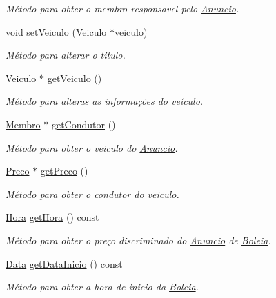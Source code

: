\begin{DoxyCompactItemize}
\begin{DoxyCompactList}\small\item\em Método para obter o membro responsavel pelo \hyperlink{class_anuncio}{Anuncio}. \end{DoxyCompactList}\item 
void \hyperlink{class_anuncio_acf4d8a46abfa73a073f7df39b2601e17}{set\+Veiculo} (\hyperlink{class_veiculo}{Veiculo} $\ast$\hyperlink{class_anuncio_a3cffe1ce2024500bddaf07bd0f7ecc81}{veiculo})
\begin{DoxyCompactList}\small\item\em Método para alterar o titulo. \end{DoxyCompactList}\item 
\hyperlink{class_veiculo}{Veiculo} $\ast$ \hyperlink{class_anuncio_ae68f4b30d497dbccf1e3ab5f83b140da}{get\+Veiculo} ()
\begin{DoxyCompactList}\small\item\em Método para alteras as informações do veículo. \end{DoxyCompactList}\item 
\hyperlink{class_membro}{Membro} $\ast$ \hyperlink{class_anuncio_a6344f8ce7de909f6841429ac14b97b7a}{get\+Condutor} ()
\begin{DoxyCompactList}\small\item\em Método para obter o veiculo do \hyperlink{class_anuncio}{Anuncio}. \end{DoxyCompactList}\item 
\hyperlink{class_preco}{Preco} $\ast$ \hyperlink{class_anuncio_a566dfb63e64851909367d5136963670d}{get\+Preco} ()
\begin{DoxyCompactList}\small\item\em Método para obter o condutor do veiculo. \end{DoxyCompactList}\item 
\hyperlink{class_hora}{Hora} \hyperlink{class_anuncio_a8850dd9d778dfe5ea92268f654d7b563}{get\+Hora} () const 
\begin{DoxyCompactList}\small\item\em Método para obter o preço discriminado do \hyperlink{class_anuncio}{Anuncio} de \hyperlink{class_boleia}{Boleia}. \end{DoxyCompactList}\item 
\hyperlink{class_data}{Data} \hyperlink{class_anuncio_a7d85e1cf72f81a767ca666cb17ef88ac}{get\+Data\+Inicio} () const 
\begin{DoxyCompactList}\small\item\em Método para obter a hora de inicio da \hyperlink{class_boleia}{Boleia}. \end{DoxyCompactList}\item 

\end{DoxyCompactItemize}
